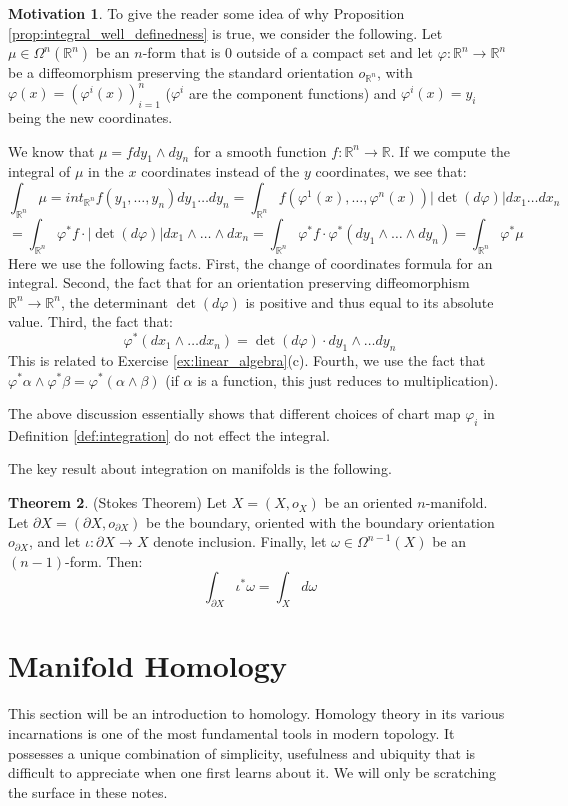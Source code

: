 \documentclass[12pt]{article}
\theoremstyle{definition}
\newtheorem{theorem}{Theorem}[section]
\newtheorem{motivation}[theorem]{Motivation}
\numberwithin{equation}{section}
\newcommand{\R}{{\mathbb R}}
\newcommand{\op}{\operatorname}
\begin{document}
\begin{motivation} To give the reader some idea of why Proposition \ref{prop:integral_well_definedness} is true, we consider the following. Let $\mu \in \Omega^n(\R^n)$ be an $n$-form that is $0$ outside of a compact set and let $\varphi:\R^n \to \R^n$ be a diffeomorphism preserving the standard orientation $o_{\R^n}$, with $\varphi(x) = (\varphi^i(x))_{i=1}^n$ ($\varphi^i$ are the component functions) and $\varphi^i(x) = y_i$ being the new coordinates. 

We know that $\mu = f dy_1 \wedge dy_n$ for a smooth function $f:\R^n \to \R$. If we compute the integral of $\mu$ in the $x$ coordinates inst{}ead of the $y$ coordinates, we see that:
\[
\int_{\R^n} \mu = int_{\R^n} f(y_1,\dots,y_n) dy_1\dots dy_n = \int_{\R^n} f(\varphi^1(x),\dots,\varphi^n(x)) |\op{det}(d\varphi)| dx_1 \dots dx_n\]
\[= \int_{\R^n} \varphi^*f \cdot |\op{det}(d\varphi)| dx_1 \wedge \dots \wedge dx_n  = \int_{\R^n} \varphi^*f \cdot \varphi^*(dy_1 \wedge \dots \wedge dy_n) = \int_{\R^n} \varphi^*\mu
\]
Here we use the following facts. First, the change of coordinates formula for an integral. Second, the fact that for an orientation preserving diffeomorphism $\R^n \to \R^n$, the determinant $\op{det}(d\varphi)$ is positive and thus equal to its absolute value. Third, the fact that:
\[\varphi^*(dx_1 \wedge \dots dx_n) = \op{det}(d\varphi) \cdot dy_1 \wedge \dots dy_n\]
This is related to Exercise \ref{ex:linear_algebra}(c). Fourth, we use the fact that $\varphi^*\alpha \wedge \varphi^*\beta = \varphi^*(\alpha \wedge \beta)$ (if $\alpha$ is a function, this just reduces to multiplication). 

The above discussion essentially shows that different choices of chart map $\varphi_i$ in Definition \ref{def:integration} do not effect the integral. 
\end{motivation}

The key result about integration on manifolds is the following.

\begin{theorem} \label{thm:stokes} (Stokes Theorem) Let $X = (X,o_X)$ be an oriented $n$-manifold. Let $\partial X = (\partial X,o_{\partial X})$ be the boundary, oriented with the boundary orientation $o_{\partial X}$, and let $\iota:\partial X \to X$ denote inclusion. Finally, let $\omega \in \Omega^{n-1}(X)$ be an $(n-1)$-form. Then: 
\[
\int_{\partial X} \iota^*\omega = \int_X d\omega
\]
\end{theorem}

\section{Manifold Homology} \label{sec:manifold_homology} This section will be an introduction to homology. Homology theory in its various incarnations is one of the most fundamental tools in modern topology. It possesses a unique combination of simplicity, usefulness and ubiquity that is difficult to appreciate when one first learns about it. We will only be scratching the surface in these notes.
\end{document}

